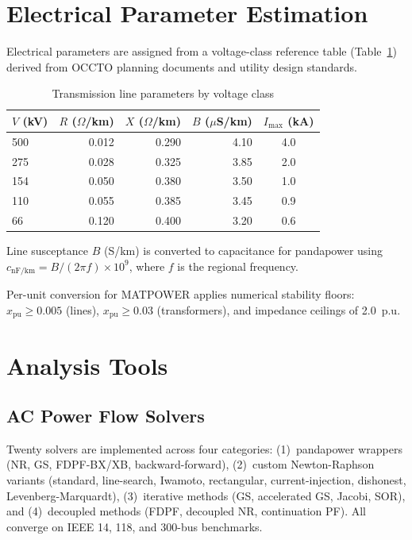 \documentclass[journal]{IEEEtran}
\begin{document}
\section{Electrical Parameter Estimation}

Electrical parameters are assigned from a voltage-class reference table (Table~\ref{tab:line_params}) derived from OCCTO planning documents and utility design standards.

\begin{table}[t]
  \centering
  \caption{Transmission line parameters by voltage class}
  \label{tab:line_params}
  \begin{tabular}{lrrrc}
    \toprule
    $V$ (kV) & $R$ ($\Omega$/km) & $X$ ($\Omega$/km) & $B$ ($\mu$S/km) & $I_\text{max}$ (kA) \\
    \midrule
    500 & 0.012 & 0.290 & 4.10 & 4.0 \\
    275 & 0.028 & 0.325 & 3.85 & 2.0 \\
    154 & 0.050 & 0.380 & 3.50 & 1.0 \\
    110 & 0.055 & 0.385 & 3.45 & 0.9 \\
     66 & 0.120 & 0.400 & 3.20 & 0.6 \\
    \bottomrule
  \end{tabular}
\end{table}

Line susceptance $B$ (S/km) is converted to capacitance for pandapower using $c_\text{nF/km} = B / (2\pi f) \times 10^9$, where $f$ is the regional frequency.

Per-unit conversion for MATPOWER applies numerical stability floors: $x_\text{pu} \geq 0.005$ (lines), $x_\text{pu} \geq 0.03$ (transformers), and impedance ceilings of 2.0~p.u.

\section{Analysis Tools}

\subsection{AC Power Flow Solvers}
Twenty solvers are implemented across four categories: (1)~pandapower wrappers (NR, GS, FDPF-BX/XB, backward-forward), (2)~custom Newton-Raphson variants (standard, line-search, Iwamoto, rectangular, current-injection, dishonest, Levenberg-Marquardt), (3)~iterative methods (GS, accelerated GS, Jacobi, SOR), and (4)~decoupled methods (FDPF, decoupled NR, continuation PF). All converge on IEEE 14, 118, and 300-bus benchmarks.
\end{document}
